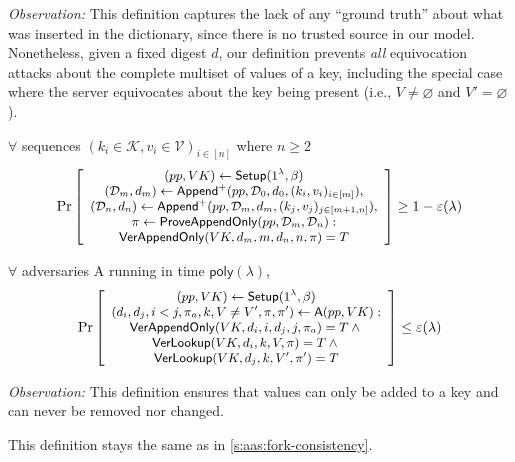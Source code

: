 \noindent \textit{Observation:}
This definition captures the lack of any ``ground truth'' about what was inserted in the dictionary, since there is no trusted source in our model.
Nonetheless, given a fixed digest $d$, our definition prevents \textit{all} equivocation attacks about the complete multiset of values of a key, including the special case where the server equivocates about the key being present (i.e., $V \ne \varnothing$ and $V' = \varnothing$).

\label{s:aad:appendonly-correctness}
$\forall$ sequences $(k_i\in \mathcal{K}, v_i\in\mathcal{V})_{i\in [n]}$ where $n\ge 2$
\begin{align*}
\small
\Pr \left[ \begin{array}{c}
    (pp,VK) \leftarrow \mathsf{Setup}(1^\lambda, \beta) \\
    (\mathcal{D}_m, d_m) \leftarrow \mathsf{Append}^{+}(pp,\mathcal{D}_0,d_0,(k_i, v_i)_{i\in [m]}),\\
    (\mathcal{D}_n, d_n) \leftarrow \mathsf{Append}^{+}(pp,\mathcal{D}_m,d_m,(k_j, v_j)_{j\in [m+1,n]}),  \\
    \pi \leftarrow \mathsf{ProveAppendOnly}(pp,\mathcal{D}_m, \mathcal{D}_n):\\
    {\mathsf{VerAppendOnly}(VK, d_m, m, d_n, n, \pi) = T}
\end{array} \right] \ge 1 - \varepsilon(\lambda)
\end{align*}

\label{s:aad:appendonly-security}
$\forall$ adversaries \textsf{A} running in time $\mathsf{poly}(\lambda)$,
\begin{align*}
\small
\Pr \left[ \begin{array}{c}
    (pp,VK) \leftarrow \mathsf{Setup}(1^\lambda, \beta)\\
    (d_i,d_j,i<j,\pi_a, k,V\ne V',\pi,\pi') \leftarrow \mathsf{A}(pp, VK)
    : \\
    {\mathsf{VerAppendOnly}(VK, d_i, i, d_j, j, \pi_a) = T} \wedge {}\\
    {\mathsf{VerLookup}(VK, d_i, k, V , \pi )  = T} \wedge {}\\
    {\mathsf{VerLookup}(VK, d_j, k, V', \pi') = T}
\end{array} \right] \le \varepsilon(\lambda)
\end{align*}

\noindent \textit{Observation:}
This definition ensures that values can only be added to a key and can never be removed nor changed.

This definition stays the same as in \cref{s:aas:fork-consistency}.
